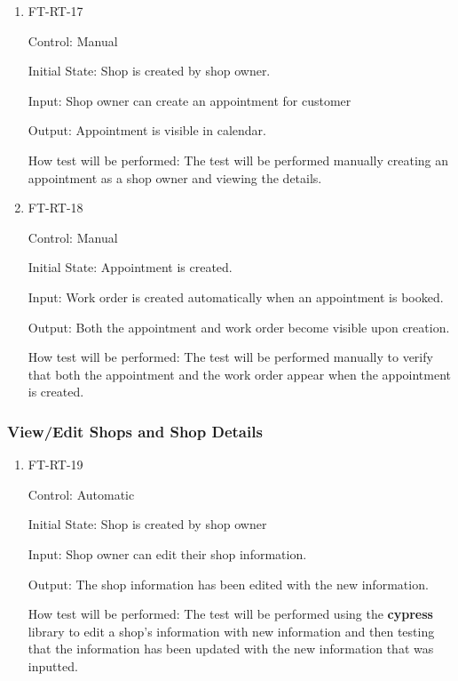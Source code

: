 \documentclass[12pt, titlepage]{article}
\begin{document}
\begin{enumerate}
\item{FT-RT-17\\}

Control: Manual

Initial State: Shop is created by shop owner.

Input: Shop owner can create an appointment for customer

Output: Appointment is visible in calendar.

How test will be performed: The test will be performed manually creating an appointment as a shop owner and viewing the details.

\item{FT-RT-18\\}

Control: Manual

Initial State: Appointment is created.

Input: Work order is created automatically when an appointment is booked.

Output: Both the appointment and work order become visible upon creation.

How test will be performed: The test will be performed manually to verify that both the appointment and the work order appear when the appointment is created.

\end{enumerate}

\subsubsection{View/Edit Shops and Shop Details}

\begin{enumerate}

\item{FT-RT-19\\}

Control: Automatic
					
Initial State: Shop is created by shop owner
					
Input: Shop owner can edit their shop information.
					
Output: The shop information has been edited with the new information.

How test will be performed: The test will be performed using the \textbf{cypress} library to edit a shop's information with new information and then testing that the information has been updated with the new information that was inputted.

\end{enumerate}
\end{document}
